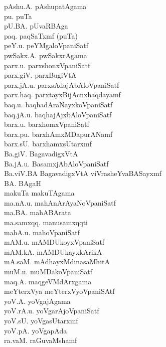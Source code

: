 {\begin{multicols}{2}
\begin{tabbing}
pAshu.A. \> pAshupatAgama\\[2pt]
pu. \> puTa\\[2pt]
pU.BA. \> pUvaRBAga\\[2pt]
paq. \> paqSaTxmf (puTa)\\[2pt]
peY.u. \> peYMgaloVpaniSatf\\[2pt]
pwSakx.A. \> pwSakxrAgama\\[2pt]
parx.u. \> parxshonxVpaniSatf\\[2pt]
parx.giV. \> parxBugiVtA\\[2pt]
parx.jA.u. \> parxsAdajAbAloVpaniSatf\\[2pt]
parx.haq. \> parxtayxBijAcnxhaqdayamf\\[2pt]
baq.u. \> baqhadAraNayxkoVpaniSatf\\[2pt]
baq.jA.u. \> baqhajAjxbAloVpaniSatf\\[2pt]
barx.u. \> barxhomxVpaniSatf\\[2pt]
barx.pu. \> barxhAmxMDapurANamf\\[2pt]
barx.sU. \> barxhamxsUtarxmf\\[2pt]
Ba.giV. \> BagavadigxVtA\\[2pt]
Ba.jA.u. \> BasamxjAbAloVpaniSatf\\[2pt]
Ba.viV.BA \> BagavadigxVtA viVrasheYvaBASayxmf\\[2pt]
BA. \> BAgaH\\[2pt]
makuTa \> makuTAgama\\[2pt]
ma.nA.u. \> mahAnArAyaNoVpaniSatf\\[2pt]
ma.BA. \> mahABArata\\[2pt]
ma.samxqq. \> manusamxqqti\\[2pt]
mahA.u. \> mahoVpaniSatf\\[2pt]
mAM.u. \> mAMDUkoyxVpaniSatf\\[2pt]
mAM.kA. \> mAMDUkayxkArikA\\[2pt]
mA.saM. \> mAdhayxMdinasaMhitA\\[2pt]
muM.u. \> muMDakoVpaniSatf\\[2pt]
maq.A. \> maqgeVMdArxgama\\[2pt]
meYterxVya \> meYterxVyoVpaniSAtf\\[2pt]
yoV.A. \> yoVgajAgama\\[2pt]
yoV.rA.u. \> yoVgarAjoVpaniSatf\\[2pt]
yoV.sU. \> yoVgasUtarxmf\\[2pt]
yoV.pA. \> yoVgapAda\\[2pt]
ra.vaM. \> raGuvaMshamf\\[2pt]

\end{tabbing}
\end{multicols}}
